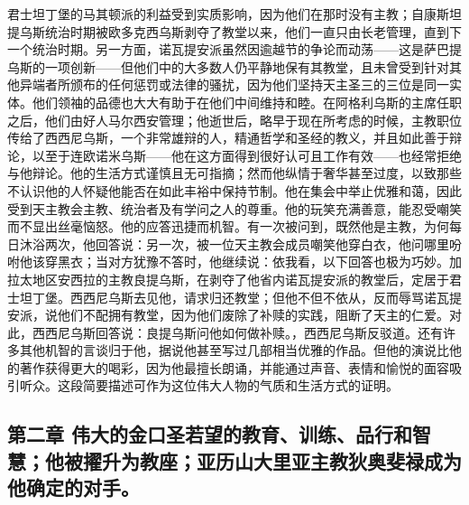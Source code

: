 君士坦丁堡的马其顿派的利益受到实质影响，因为他们在那时没有主教；自康斯坦提乌斯统治时期被欧多克西乌斯剥夺了教堂以来，他们一直只由长老管理，直到下一个统治时期。另一方面，诺瓦提安派虽然因逾越节的争论而动荡——这是萨巴提乌斯的一项创新——但他们中的大多数人仍平静地保有其教堂，且未曾受到针对其他异端者所颁布的任何惩罚或法律的骚扰，因为他们坚持天主圣三的三位是同一实体。他们领袖的品德也大大有助于在他们中间维持和睦。在阿格利乌斯的主席任职之后，他们由好人马尔西安管理；他逝世后，略早于现在所考虑的时候，主教职位传给了西西尼乌斯，一个非常雄辩的人，精通哲学和圣经的教义，并且如此善于辩论，以至于连欧诺米乌斯——他在这方面得到很好认可且工作有效——也经常拒绝与他辩论。他的生活方式谨慎且无可指摘；然而他纵情于奢华甚至过度，以致那些不认识他的人怀疑他能否在如此丰裕中保持节制。他在集会中举止优雅和蔼，因此受到天主教会主教、统治者及有学问之人的尊重。他的玩笑充满善意，能忍受嘲笑而不显出丝毫恼怒。他的应答迅捷而机智。有一次被问到，既然他是主教，为何每日沐浴两次，他回答说：另一次，被一位天主教会成员嘲笑他穿白衣，他问哪里吩咐他该穿黑衣；当对方犹豫不答时，他继续说：依我看，以下回答也极为巧妙。加拉太地区安西拉的主教良提乌斯，在剥夺了他省内诺瓦提安派的教堂后，定居于君士坦丁堡。西西尼乌斯去见他，请求归还教堂；但他不但不依从，反而辱骂诺瓦提安派，说他们不配拥有教堂，因为他们废除了补赎的实践，阻断了天主的仁爱。对此，西西尼乌斯回答说：良提乌斯问他如何做补赎。，西西尼乌斯反驳道。还有许多其他机智的言谈归于他，据说他甚至写过几部相当优雅的作品。但他的演说比他的著作获得更大的喝彩，因为他最擅长朗诵，并能通过声音、表情和愉悦的面容吸引听众。这段简要描述可作为这位伟大人物的气质和生活方式的证明。\par


\subsection{第二章  伟大的金口圣若望的教育、训练、品行和智慧；他被擢升为教座；亚历山大里亚主教狄奥斐禄成为他确定的对手。}

